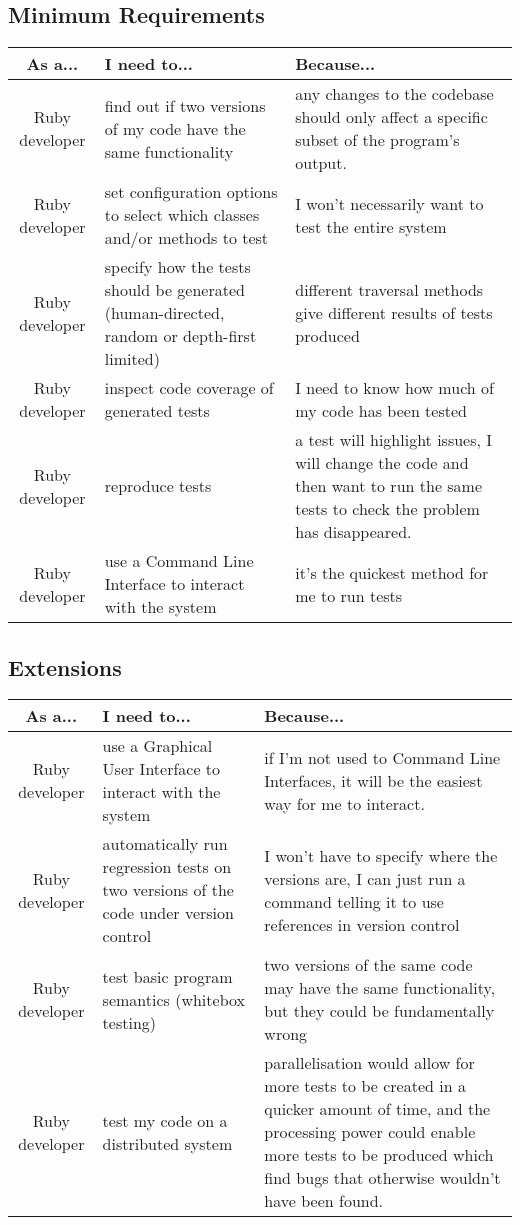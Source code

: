   \subsection{Minimum Requirements}
    \begin{tabular}{| c | p{5cm} | p{5cm} |}
    \hline
    \textbf{As a...} & \textbf{I need to...} & \textbf{Because...} \\
    \hline
    Ruby developer & find out if two versions of my code have the same functionality & any changes to the codebase should only affect a specific subset of the program’s output. \\
    \hline
    Ruby developer & set configuration options to select which classes and/or methods to test & I won't necessarily want to test the entire system \\
    \hline
    Ruby developer & specify how the tests should be generated (human-directed, random or depth-first limited) & different traversal methods give different results of tests produced \\
    Ruby developer & inspect code coverage of generated tests & I need to know how much of my code has been tested \\
    \hline
    Ruby developer & reproduce tests & a test will highlight issues, I will change the code and then want to run the same tests to check the problem has disappeared. \\
    \hline
    Ruby developer & use a Command Line Interface to interact with the system & it's the quickest method for me to run tests \\
    \hline
    \end{tabular}
  \subsection{Extensions}
    \begin{tabular}{| c | p{5cm} | p{5cm} |}
    \hline
    \textbf{As a...} & \textbf{I need to...} & \textbf{Because...} \\
    \hline
    Ruby developer & use a Graphical User Interface to interact with the system & if I'm not used to Command Line Interfaces, it will be the easiest way for me to interact. \\
    \hline
    Ruby developer & automatically run regression tests on two versions of the code under version control & I won't have to specify where the versions are, I can just run a command telling it to use references in version control \\
    \hline
    Ruby developer & test basic program semantics (whitebox testing) & two versions of the same code may have the same functionality, but they could be fundamentally wrong \\
    \hline
    Ruby developer & test my code on a distributed system & parallelisation would allow for more tests to be created in a quicker amount of time, and the processing power could enable more tests to be produced which find bugs that otherwise wouldn't have been found. \\
    \hline
    \end{tabular}
